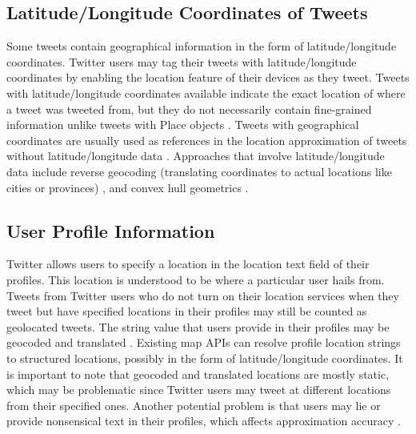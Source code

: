 \subsection{Latitude/Longitude Coordinates of Tweets}
Some tweets contain geographical information in the form of latitude/longitude coordinates. Twitter users may tag their tweets with latitude/longitude coordinates by enabling the location feature of their devices as they tweet. Tweets with latitude/longitude coordinates available indicate the exact location of where a tweet was tweeted from, but they do not necessarily contain fine-grained information unlike tweets with Place objects \cite{OBCS2013, GFC2012, carmen}. Tweets with geographical coordinates are usually used as references in the location approximation of tweets without latitude/longitude data \cite{ROSALES2017, VELASCOBERMEJODOMINGO2018}. Approaches that involve latitude/longitude data include reverse geocoding (translating coordinates to actual locations like cities or provinces) \cite{carmen}, and convex hull geometrics \cite{ROSALES2017, VELASCOBERMEJODOMINGO2018}.

\subsection{User Profile Information}
Twitter allows users to specify a location in the location text field of their profiles. This location is understood to be where a particular user hails from. Tweets from Twitter users who do not turn on their location services when they tweet but have specified locations in their profiles may still be counted as geolocated tweets. The string value that users provide in their profiles may be geocoded and translated \cite{OBCS2013, GFC2012, carmen}. Existing map APIs can resolve profile location strings to structured locations, possibly in the form of latitude/longitude coordinates. It is important to note that geocoded and translated locations are mostly static, which may be problematic since Twitter users may tweet at different locations from their specified ones. Another potential problem is that users may lie or provide nonsensical text in their profiles, which affects approximation accuracy \cite{L12011, L22014}.

